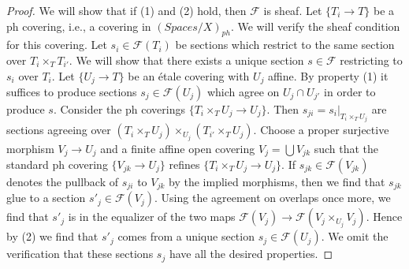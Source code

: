 \documentclass{stacks-project}
\theoremstyle{plain}
\theoremstyle{definition}
\theoremstyle{remark}
\numberwithin{equation}{subsection}
\begin{document}
\begin{proof}
We will show that if (1) and (2) hold, then $\mathcal{F}$ is sheaf.
Let $\{T_i \to T\}$ be a ph covering, i.e., a covering in
$(\textit{Spaces}/X)_{ph}$.
We will verify the sheaf condition for this covering.
Let $s_i \in \mathcal{F}(T_i)$ be sections which restrict to the same
section over $T_i \times_T T_{i'}$. We will show that there exists a
unique section $s \in \mathcal{F}$ restricting to $s_i$ over $T_i$.
Let $\{U_j \to T\}$ be an \'etale covering with $U_j$ affine.
By property (1) it suffices to produce sections $s_j \in \mathcal{F}(U_j)$
which agree on $U_j \cap U_{j'}$ in order to produce $s$.
Consider the ph coverings $\{T_i \times_T U_j \to U_j\}$.
Then $s_{ji} = s_i|_{T_i \times_T U_j}$ are sections agreeing
over $(T_i \times_T U_j) \times_{U_j} (T_{i'} \times_T U_j)$.
Choose a proper surjective morphism $V_j \to U_j$ and a finite affine
open covering $V_j = \bigcup V_{jk}$ such that the standard ph covering
$\{V_{jk} \to U_j\}$ refines $\{T_i \times_T U_j \to U_j\}$.
If $s_{jk} \in \mathcal{F}(V_{jk})$
denotes the pullback of $s_{ji}$ to $V_{jk}$ by the
implied morphisms, then we find that $s_{jk}$ glue to a section
$s'_j \in \mathcal{F}(V_j)$. Using the agreement on overlaps
once more, we find that $s'_j$ is in the equalizer of the two
maps $\mathcal{F}(V_j) \to \mathcal{F}(V_j \times_{U_j} V_j)$.
Hence by (2) we find that $s'_j$ comes from a unique section
$s_j \in \mathcal{F}(U_j)$. We omit the verification that these
sections $s_j$ have all the desired properties.
\end{proof}
\end{document}
